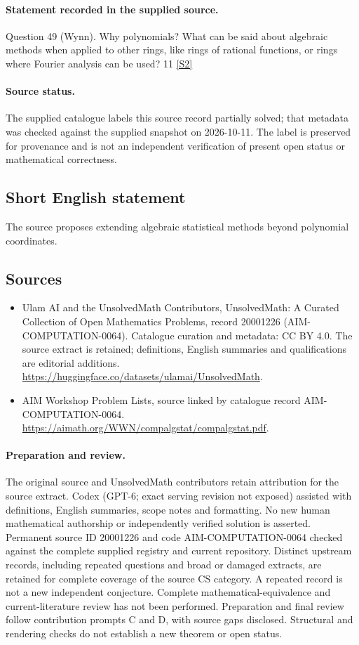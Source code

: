 \documentclass[11pt]{article}
\begin{document}
\paragraph{Statement recorded in the supplied source.}
Question 49 (Wynn). Why polynomials? What can be said about algebraic methods when applied to other rings, like rings of rational functions, or rings where Fourier analysis can be used? 11 \href{https://aimath.org/WWN/compalgstat/compalgstat.pdf}{[S2]}
\paragraph{Source status.}
The supplied catalogue labels this source record partially solved; that metadata was checked against the supplied snapshot on 2026-10-11. The label is preserved for provenance and is not an independent verification of present open status or mathematical correctness.
\subsection{Short English statement}
The source proposes extending algebraic statistical methods beyond polynomial coordinates.
\subsection{Sources}
\begin{itemize}
\item[S1] Ulam AI and the UnsolvedMath Contributors, UnsolvedMath: A Curated Collection of Open Mathematics Problems, record 20001226 (AIM-COMPUTATION-0064). Catalogue curation and metadata: CC BY 4.0. The source extract is retained; definitions, English summaries and qualifications are editorial additions.
\url{https://huggingface.co/datasets/ulamai/UnsolvedMath}.
\item[S2] AIM Workshop Problem Lists, source linked by catalogue record AIM-COMPUTATION-0064.
\url{https://aimath.org/WWN/compalgstat/compalgstat.pdf}.
\end{itemize}
\paragraph{Preparation and review.}
The original source and UnsolvedMath contributors retain attribution for the source extract. Codex (GPT-6; exact serving revision not exposed) assisted with definitions, English summaries, scope notes and formatting. No new human mathematical authorship or independently verified solution is asserted. Permanent source ID 20001226 and code AIM-COMPUTATION-0064 checked against the complete supplied registry and current repository. Distinct upstream records, including repeated questions and broad or damaged extracts, are retained for complete coverage of the source CS category. A repeated record is not a new independent conjecture. Complete mathematical-equivalence and current-literature review has not been performed. Preparation and final review follow contribution prompts C and D, with source gaps disclosed. Structural and rendering checks do not establish a new theorem or open status.
\label{end:20001226}
\end{document}
